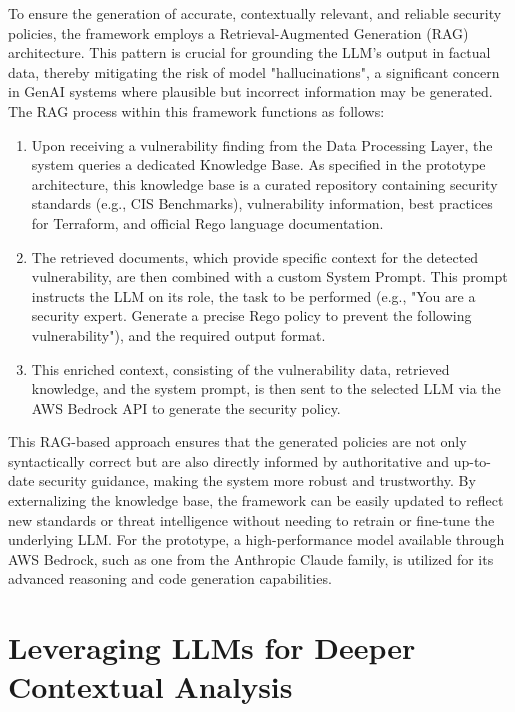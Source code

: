 To ensure the generation of accurate, contextually relevant, and reliable security policies, the framework employs a Retrieval-Augmented Generation (RAG) architecture. This pattern is crucial for grounding the LLM's output in factual data, thereby mitigating the risk of model "hallucinations", a significant concern in GenAI systems where plausible but incorrect information may be generated. The RAG process within this framework functions as follows:
\begin{enumerate}
    \item Upon receiving a vulnerability finding from the Data Processing Layer, the system queries a dedicated Knowledge Base. As specified in the prototype architecture, this knowledge base is a curated repository containing security standards (e.g., CIS Benchmarks), vulnerability information, best practices for Terraform, and official Rego language documentation.
    \item The retrieved documents, which provide specific context for the detected vulnerability, are then combined with a custom System Prompt. This prompt instructs the LLM on its role, the task to be performed (e.g., "You are a security expert. Generate a precise Rego policy to prevent the following vulnerability"), and the required output format.
    \item This enriched context, consisting of the vulnerability data, retrieved knowledge, and the system prompt, is then sent to the selected LLM via the AWS Bedrock API to generate the security policy.
\end{enumerate}

This RAG-based approach ensures that the generated policies are not only syntactically correct but are also directly informed by authoritative and up-to-date security guidance, making the system more robust and trustworthy. By externalizing the knowledge base, the framework can be easily updated to reflect new standards or threat intelligence without needing to retrain or fine-tune the underlying LLM. For the prototype, a high-performance model available through AWS Bedrock, such as one from the Anthropic Claude family, is utilized for its advanced reasoning and code generation capabilities.


\section{Leveraging LLMs for Deeper Contextual Analysis} %
\label{sec:Leveraging LLMs for Deeper Contextual Analysis}

